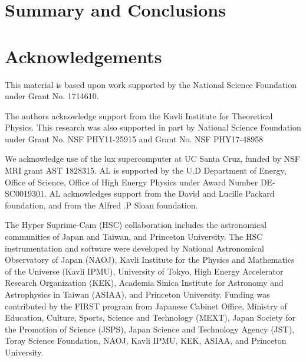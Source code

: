 \documentclass[a4paper,fleqn,usenatbib]{mnras}
\begin{document}
\section{Summary and Conclusions}
    \label{sec:summary}
    



\section*{Acknowledgements}


  This material is based upon work supported by the National Science Foundation under 
  Grant No. 1714610. 
  
  The authors acknowledge support from the Kavli Institute for Theoretical Physics.
  This research was also supported in part by National Science Foundation under Grant 
  No. NSF PHY11-25915 and Grant No. NSF PHY17-48958
  
  We acknowledge use of the lux supercomputer at UC Santa Cruz, funded by NSF MRI grant AST 1828315. AL is supported by the U.D Department of Energy, Office of Science, Office of High Energy Physics under Award Number DE-SC0019301. AL acknowledges support from the David and Lucille Packard foundation, and from the Alfred .P Sloan foundation.

  The Hyper Suprime-Cam (HSC) collaboration includes the astronomical communities of 
  Japan and Taiwan, and Princeton University.  The HSC instrumentation and software were
  developed by National Astronomical Observatory of Japan (NAOJ), Kavli Institute
  for the Physics and Mathematics of the Universe (Kavli IPMU), University of Tokyo,
  High Energy Accelerator Research Organization (KEK), Academia Sinica Institute
  for Astronomy and Astrophysics in Taiwan (ASIAA), and Princeton University.  
  Funding was contributed by the FIRST program from Japanese Cabinet Office,  Ministry 
  of Education, Culture, Sports, Science and Technology (MEXT), Japan Society for 
  the Promotion of Science (JSPS), Japan Science and Technology Agency (JST), Toray 
  Science Foundation, NAOJ, Kavli IPMU, KEK, ASIAA, and Princeton University.
   
\end{document}
